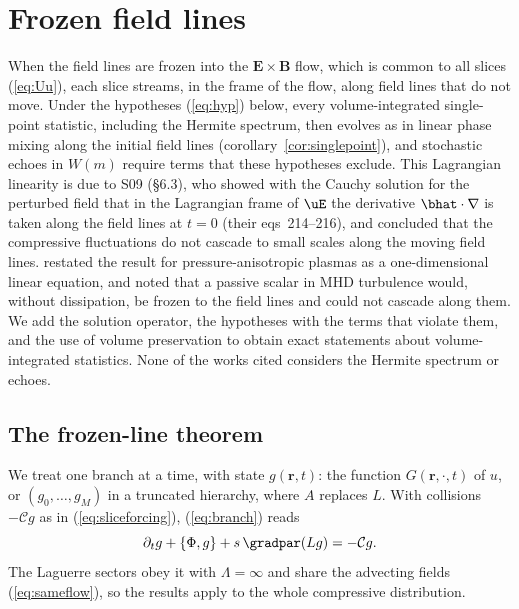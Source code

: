 \section{Frozen field lines}\label{sec:lagrangian}

When the field lines are frozen into the $\boldsymbol E\times\boldsymbol B$ flow, which is common to all slices (\ref{eq:Uu}), each slice streams, in the frame of the flow, along field lines that do not move. Under the hypotheses (\ref{eq:hyp}) below, every volume-integrated single-point statistic, including the Hermite spectrum, then evolves as in linear phase mixing along the initial field lines (corollary~\ref{cor:singlepoint}), and stochastic echoes in $W(m)$ require terms that these hypotheses exclude. This Lagrangian linearity is due to S09 (\S6.3), who showed with the Cauchy solution for the perturbed field that in the Lagrangian frame of $\uE$ the derivative $\bhat\cdot\nabla$ is taken along the field lines at $t=0$ (their eqs~214--216), and concluded that the compressive fluctuations do not cascade to small scales along the moving field lines. \citet[\S\S2.6 and~4.1]{Kunz2015} restated the result for pressure-anisotropic plasmas as a one-dimensional linear equation, and \citet[\S2.3.1]{LithwickGoldreich2001} noted that a passive scalar in MHD turbulence would, without dissipation, be frozen to the field lines and could not cascade along them. We add the solution operator, the hypotheses with the terms that violate them, and the use of volume preservation to obtain exact statements about volume-integrated statistics. None of the works cited considers the Hermite spectrum or echoes.

\subsection{The frozen-line theorem}

We treat one branch at a time, with state $g(\boldsymbol r,t)$: the function $G(\boldsymbol r,\cdot,t)$ of $u$, or $(g_0,\dots,g_M)$ in a truncated hierarchy, where $A$ replaces $L$. With collisions $-\mathcal Cg$ as in (\ref{eq:sliceforcing}), (\ref{eq:branch}) reads
\begin{equation}\label{lag:kin}
  \partial_tg+\{\Phi,g\}+s\,\gradpar(Lg)=-\mathcal Cg .
\end{equation}
The Laguerre sectors obey it with $\Lambda=\infty$ and share the advecting fields (\ref{eq:sameflow}), so the results apply to the whole compressive distribution.

